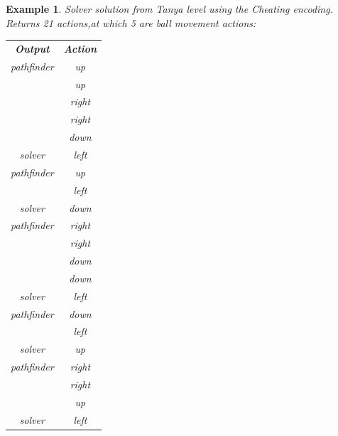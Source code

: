 \documentclass{report}
\theoremstyle{plain}
\newtheorem{example}{Example}[section]
\begin{document}
\begin{example}
\label{ex:tanya-cheating}
Solver solution from Tanya level using the \emph{Cheating encoding}. Returns 21 actions,at which 5 are ball movement actions:

\vspace{1\baselineskip}

\begin{minipage}{0.5\textwidth}
\centering
\begin{tabular}{c|c|}
    \cline{1-2}
    \multicolumn{1}{|c|}{\textbf{Output}} & \textbf{Action} \\
    \cline{1-2}
    \multicolumn{1}{|c|}{pathfinder} & up \\
    \cline{1-1}
     & up \\
     & right \\
     & right \\
     & down \\
    \cline{1-2}
    \multicolumn{1}{|c|}{solver} & left \\
    \cline{1-2}
    \multicolumn{1}{|c|}{pathfinder} & up \\
    \cline{1-1}
     & left \\
    \cline{1-2}
    \multicolumn{1}{|c|}{solver} & down \\
    \cline{1-2}
    \multicolumn{1}{|c|}{pathfinder} & right \\
    \cline{1-1}
     & right \\
     & down \\
     & down \\
    \cline{1-2}
    \multicolumn{1}{|c|}{solver} & left \\
    \cline{1-2}
    \multicolumn{1}{|c|}{pathfinder} & down \\
    \cline{1-1}
     & left \\
    \cline{1-2}
    \multicolumn{1}{|c|}{solver} & up \\
    \cline{1-2}
    \multicolumn{1}{|c|}{pathfinder} & right \\
    \cline{1-1}
     & right \\
     & up \\
    \cline{1-2}
    \multicolumn{1}{|c|}{solver} & left \\
    \cline{1-2}
\end{tabular}
\end{minipage}
\begin{minipage}{0.5\textwidth}
\centering

\end{minipage}
\end{example}
\end{document}
